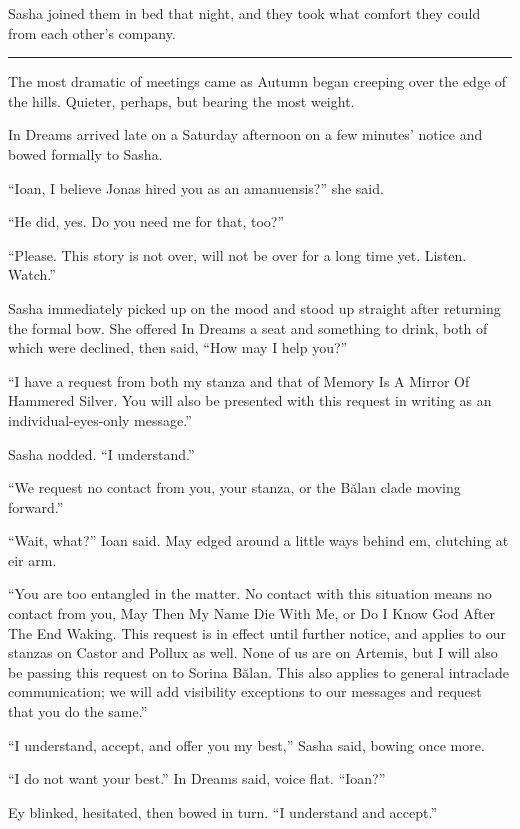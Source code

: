 Sasha joined them in bed that night, and they took what comfort they could from each other's company.

\begin{center}\rule{0.5\linewidth}{0.5pt}\end{center}

The most dramatic of meetings came as Autumn began creeping over the edge of the hills. Quieter, perhaps, but bearing the most weight.

In Dreams arrived late on a Saturday afternoon on a few minutes' notice and bowed formally to Sasha.

``Ioan, I believe Jonas hired you as an amanuensis?'' she said.

``He did, yes. Do you need me for that, too?''

``Please. This story is not over, will not be over for a long time yet. Listen. Watch.''

Sasha immediately picked up on the mood and stood up straight after returning the formal bow. She offered In Dreams a seat and something to drink, both of which were declined, then said, ``How may I help you?''

``I have a request from both my stanza and that of Memory Is A Mirror Of Hammered Silver. You will also be presented with this request in writing as an individual-eyes-only message.''

Sasha nodded. ``I understand.''

``We request no contact from you, your stanza, or the Bălan clade moving forward.''

``Wait, what?'' Ioan said. May edged around a little ways behind em, clutching at eir arm.

``You are too entangled in the matter. No contact with this situation means no contact from you, May Then My Name Die With Me, or Do I Know God After The End Waking. This request is in effect until further notice, and applies to our stanzas on Castor and Pollux as well. None of us are on Artemis, but I will also be passing this request on to Sorina Bălan. This also applies to general intraclade communication; we will add visibility exceptions to our messages and request that you do the same.''

``I understand, accept, and offer you my best,'' Sasha said, bowing once more.

``I do not want your best.'' In Dreams said, voice flat. ``Ioan?''

Ey blinked, hesitated, then bowed in turn. ``I understand and accept.''

